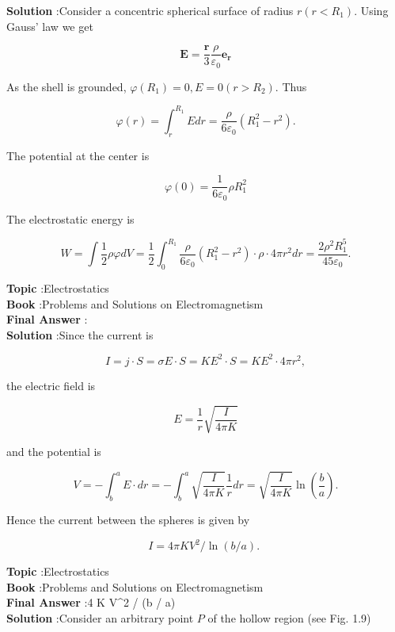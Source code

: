 \documentclass[10pt]{article}
\begin{document}
\textbf{Solution} :Consider a concentric spherical surface of radius $r\left(r<R_{1}\right)$. Using Gauss' law we get

$$
\mathbf{E}=\frac{\boldsymbol{r}}{3} \frac{\rho}{\varepsilon_{0}} \mathbf{e}_{\boldsymbol{r}}
$$

As the shell is grounded, $\varphi\left(R_{1}\right)=0, E=0\left(r>R_{2}\right)$. Thus

$$
\varphi(r)=\int_{r}^{R_{1}} E d r=\frac{\rho}{6 \varepsilon_{0}}\left(R_{1}^{2}-r^{2}\right) .
$$

The potential at the center is

$$
\varphi(0)=\frac{1}{6 \varepsilon_{0}} \rho R_{1}^{2}
$$

The electrostatic energy is

$$
W=\int \frac{1}{2} \rho \varphi d V=\frac{1}{2} \int_{0}^{R_{1}} \frac{\rho}{6 \varepsilon_{0}}\left(R_{1}^{2}-r^{2}\right) \cdot \rho \cdot 4 \pi r^{2} d r=\frac{2 \rho^{2} R_{1}^{5}}{45 \varepsilon_{0}} .
$$

\textbf{Topic} :Electrostatics\\
\textbf{Book} :Problems and Solutions on Electromagnetism\\
\textbf{Final Answer} :\\


\textbf{Solution} :Since the current is

$$
I=j \cdot S=\sigma E \cdot S=K E^{2} \cdot S=K E^{2} \cdot 4 \pi r^{2},
$$

the electric field is

$$
E=\frac{1}{r} \sqrt{\frac{I}{4 \pi K}}
$$

and the potential is

$$
V=-\int_{b}^{a} E \cdot d r=-\int_{b}^{a} \sqrt{\frac{I}{4 \pi K}} \frac{1}{r} d r=\sqrt{\frac{I}{4 \pi K}} \ln \left(\frac{b}{a}\right) .
$$

Hence the current between the spheres is given by

$$
I=4 \pi K V^{2} / \ln (b / a) \text {. }
$$



\textbf{Topic} :Electrostatics\\
\textbf{Book} :Problems and Solutions on Electromagnetism\\
\textbf{Final Answer} :4 \pi K V^{2} / \ln (b / a)\\


\textbf{Solution} :Consider an arbitrary point $P$ of the hollow region (see Fig. 1.9)
\end{document}
